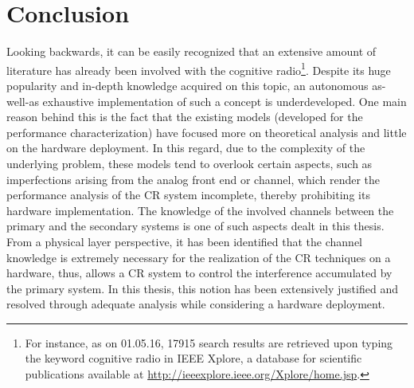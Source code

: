\chapter{Conclusion}
\label{chap:Con}

Looking backwards, it can be easily recognized that an extensive amount of literature has already been involved with the cognitive radio\footnote{For instance, as on 01.05.16, 17915 search results are retrieved upon typing the keyword cognitive radio in IEEE Xplore, a database for scientific publications available at \url{http://ieeexplore.ieee.org/Xplore/home.jsp}.}. Despite its huge popularity and in-depth knowledge acquired on this topic, an autonomous as-well-as exhaustive implementation of such a concept is underdeveloped. One main reason behind this is the fact that the existing models (developed for the performance characterization) have focused more on theoretical analysis and little on the hardware deployment. In this regard, due to the complexity of the underlying problem, these models tend to overlook certain aspects, such as imperfections arising from the analog front end or channel, which render the performance analysis of the CR system incomplete, thereby prohibiting its hardware implementation. The knowledge of the involved channels between the primary and the secondary systems is one of such aspects dealt in this thesis. 
From a physical layer perspective, it has been identified that the channel knowledge is extremely necessary for the realization of the CR techniques on a hardware, thus, allows a CR system to control the interference accumulated by the primary system. In this thesis, this notion has been extensively justified and resolved through adequate analysis while considering a hardware deployment. %

